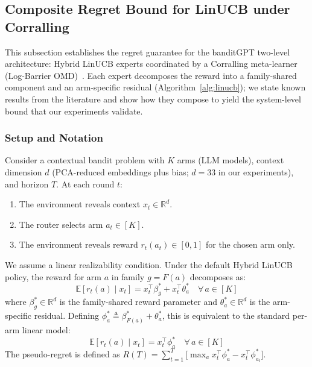 
\subsection{Composite Regret Bound for LinUCB under Corralling}
\label{appendix:regret_decomposition}

This subsection establishes the regret guarantee for the banditGPT two-level
architecture: Hybrid LinUCB experts coordinated by a Corralling
meta-learner (Log-Barrier OMD)~\cite{agarwal2017corralling}.  Each expert decomposes the reward
into a family-shared component and an arm-specific residual
(Algorithm~\ref{alg:linucb}); we state known results from the literature and
show how they compose to yield the system-level bound that our experiments
validate.

\subsubsection{Setup and Notation}

Consider a contextual bandit problem with $K$ arms (LLM models), context
dimension $d$ (PCA-reduced embeddings plus bias; $d=33$ in our experiments),
and horizon $T$.  At each round $t$:

\begin{enumerate}[leftmargin=*,noitemsep]
    \item The environment reveals context $x_t \in \mathbb{R}^d$.
    \item The router selects arm $a_t \in [K]$.
    \item The environment reveals reward $r_t(a_t) \in [0, 1]$ for the chosen arm only.
\end{enumerate}

We assume a linear realizability condition.  Under the default Hybrid LinUCB
policy, the reward for arm $a$ in family $g = F(a)$ decomposes as:
\begin{equation}
\mathbb{E}[r_t(a) \mid x_t] = x_t^\top \beta_g^* + x_t^\top \theta_a^*
\quad \forall\, a \in [K]
\label{eq:hybrid_reward}
\end{equation}
where $\beta_g^* \in \mathbb{R}^d$ is the family-shared reward parameter and
$\theta_a^* \in \mathbb{R}^d$ is the arm-specific residual.  Defining
$\phi_a^* \triangleq \beta_{F(a)}^* + \theta_a^*$, this is equivalent to the
standard per-arm linear model:
\begin{equation}
\mathbb{E}[r_t(a) \mid x_t] = x_t^\top \phi_a^* \quad \forall\, a \in [K]
\label{eq:linear_reward}
\end{equation}
The pseudo-regret is defined as
$R(T) = \sum_{t=1}^T \bigl[ \max_{a} x_t^\top \phi_a^* - x_t^\top \phi_{a_t}^* \bigr]$.


